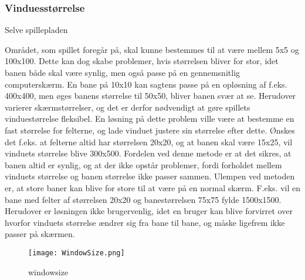 \subsubsection{Vinduesstørrelse}
Selve spillepladen 

Området, som spillet foregår på, skal kunne bestemmes til at være mellem 5x5 og 100x100. Dette kan dog skabe problemer, hvis størrelsen bliver for stor, idet banen både skal være synlig, men også passe på en gennemsnitlig computerskærm. En bane på 10x10 kan sagtens passe på en opløsning af f.eks. 400x400, men øges banens størrelse til 50x50, bliver banen svær at se. Herudover varierer skærmstørrelser, og det er derfor nødvendigt at gøre spillets vinduestørrelse fleksibel. En løsning på dette problem ville være at bestemme en fast størrelse for felterne, og lade vinduet justere sin størrelse efter dette. Ønskes det f.eks. at felterne altid har størrelsen 20x20, og at banen skal være 15x25, vil vinduets størrelse blive 300x500. Fordelen ved denne metode er at det sikres, at banen altid er synlig, og at der ikke opstår problemer, fordi forholdet mellem vinduets størrelse og banen størrelse ikke passer sammen. Ulempen ved metoden er, at store baner kan blive for store til at være på en normal skærm. F.eks. vil en bane med felter af størrelsen 20x20 og banestørrelsen 75x75 fylde 1500x1500. Herudover er løsningen ikke brugervenlig, idet en bruger kan blive forvirret over hvorfor vinduets størrelse ændrer sig fra bane til bane, og måske ligefrem ikke passer på skærmen.


\begin{figure}[h]
	\centering
	\graphicspath{ {pics/} }
	\texttt{[image: WindowSize.png]}
	\label{fig:windowsize}
	\caption{windowsize}
\end{figure}
